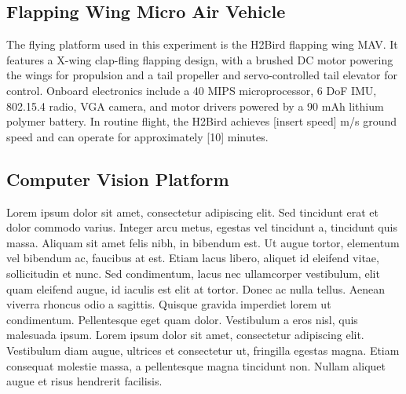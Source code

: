 \documentclass[letterpaper, 10 pt, conference]{ieeeconf}
\begin{document}
\subsection{Flapping Wing Micro Air Vehicle}
The flying platform used in this experiment is the H2Bird flapping wing MAV. It features a X-wing clap-fling flapping design, with a brushed DC motor powering the wings for propulsion and a tail propeller and servo-controlled tail elevator for control. Onboard electronics include a 40 MIPS microprocessor, 6 DoF IMU, 802.15.4 radio, VGA camera, and motor drivers powered by a 90 mAh lithium polymer battery. In routine flight, the H2Bird achieves [insert speed] m/s ground speed and can operate for approximately [10] minutes.

\subsection{Computer Vision Platform}
Lorem ipsum dolor sit amet, consectetur adipiscing elit. Sed tincidunt erat et dolor commodo varius. Integer arcu metus, egestas vel tincidunt a, tincidunt quis massa. Aliquam sit amet felis nibh, in bibendum est. Ut augue tortor, elementum vel bibendum ac, faucibus at est. Etiam lacus libero, aliquet id eleifend vitae, sollicitudin et nunc. Sed condimentum, lacus nec ullamcorper vestibulum, elit quam eleifend augue, id iaculis est elit at tortor. Donec ac nulla tellus. Aenean viverra rhoncus odio a sagittis. Quisque gravida imperdiet lorem ut condimentum. Pellentesque eget quam dolor. Vestibulum a eros nisl, quis malesuada ipsum. Lorem ipsum dolor sit amet, consectetur adipiscing elit. Vestibulum diam augue, ultrices et consectetur ut, fringilla egestas magna. Etiam consequat molestie massa, a pellentesque magna tincidunt non. Nullam aliquet augue et risus hendrerit facilisis.


\end{document}
